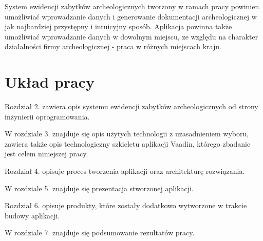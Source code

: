 System ewidencji zabytków archeologicznych tworzony w ramach pracy powinien umożliwiać wprowadzanie danych i generowanie dokumentacji archeologicznej w jak najbardziej przystępny i intuicyjny sposób. Aplikacja powinna także umożliwiać wprowadzanie danych w dowolnym miejscu, ze względu na charakter działalności firmy archeologicznej - praca w różnych miejscach kraju.
\section{Układ pracy}
Rozdział 2. zawiera opis systemu ewidencji zabytków archeologicznych od strony inżynierii oprogramowania.

W rozdziale 3. znajduje się opis użytych technologii z uzasadnieniem wyboru, zawiera także opis technologiczny szkieletu aplikacji Vaadin, którego zbadanie jest celem niniejszej pracy.

Rozdział 4. opisuje proces tworzenia aplikacji oraz architekturę rozwiązania.

W rozdziale 5. znajduje się prezentacja stworzonej aplikacji.

Rozdział 6. opisuje produkty, które zostały dodatkowo wytworzone w trakcie budowy aplikacji.

W rozdziale 7. znajduje się podsumowanie rezultatów pracy.

